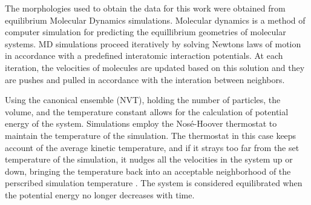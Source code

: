 The morphologies used to
obtain the data for this work were obtained from equilibrium Molecular Dynamics simulations. 
Molecular dynamics is a method of computer simulation for predicting the equillibrium geometries of molecular
systems. MD simulations proceed iteratively by solving Newtons laws of motion
in accordance with a predefined interatomic interaction potentials.
At each iteration, the velocities of molecules are
updated based on this solution and they are pushes and pulled in accordance with
the interation between neighbors.

Using the canonical ensemble (NVT), holding the number of
particles, the volume, and the temperature constant allows for the calculation of 
potential energy of the system.  
Simulations employ the Nos\'{e}-Hoover thermostat to maintain the temperature of the simulation. 
The thermostat in this case keeps account of the average kinetic temperature, and if it strays too far from the set temperature of the
simulation, it nudges all the velocities in the system up or down, bringing the temperature back into an
acceptable neighborhood of the perscribed simulation temperature \cite{Martyna1994d}\cite{Cao1996}.
The system is considered equilibrated when the potential energy no longer decreases with time. 

